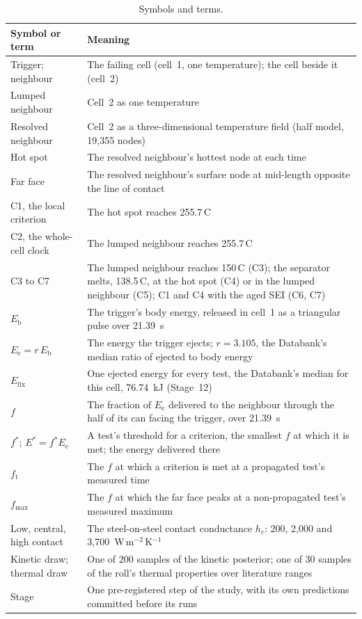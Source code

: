 \documentclass[preprint,12pt]{elsarticle}
\newcommand{\degC}{\,\textdegree C}
\newcommand{\fs}{f^{*}}
\newcommand{\ft}{f_{\mathrm{t}}}
\newcommand{\fmax}{f_{\mathrm{max}}}
\newcommand{\Eb}{E_{\mathrm{b}}}
\newcommand{\Ee}{E_{\mathrm{e}}}
\begin{document}
\begin{table}[!tbp]
\centering
\footnotesize
\caption{Symbols and terms.}
\label{tab:terms}
\begin{tabular}{@{}p{}p{}@{}}
\toprule
Symbol or term & Meaning \\
\midrule
Trigger; neighbour & The failing cell (cell~1, one temperature); the cell beside it (cell~2) \\
Lumped neighbour & Cell~2 as one temperature \\
Resolved neighbour & Cell~2 as a three-dimensional temperature field (half model, 19,355 nodes) \\
Hot spot & The resolved neighbour's hottest node at each time \\
Far face & The resolved neighbour's surface node at mid-length opposite the line of contact \\
C1, the local criterion & The hot spot reaches 255.7\degC{} \\
C2, the whole-cell clock & The lumped neighbour reaches 255.7\degC{} \\
C3 to C7 & The lumped neighbour reaches 150\degC{} (C3); the separator melts, 138.5\degC, at the hot spot (C4) or in the lumped neighbour (C5); C1 and C4 with the aged SEI (C6, C7) \\
$\Eb$ & The trigger's body energy, released in cell~1 as a triangular pulse over 21.39~s \\
$\Ee=r\,\Eb$ & The energy the trigger ejects; $r=3.105$, the Databank's median ratio of ejected to body energy \\
$E_{\mathrm{fix}}$ & One ejected energy for every test, the Databank's median for this cell, 76.74~kJ (Stage~12) \\
$f$ & The fraction of $\Ee$ delivered to the neighbour through the half of its can facing the trigger, over 21.39~s \\
$\fs$; $E^{*}=\fs\Ee$ & A test's threshold for a criterion, the smallest $f$ at which it is met; the energy delivered there \\
$\ft$ & The $f$ at which a criterion is met at a propagated test's measured time \\
$\fmax$ & The $f$ at which the far face peaks at a non-propagated test's measured maximum \\
Low, central, high contact & The steel-on-steel contact conductance $h_c$: 200, 2,000 and 3,700~W\,m$^{-2}$\,K$^{-1}$ \\
Kinetic draw; thermal draw & One of 200 samples of the kinetic posterior; one of 30 samples of the roll's thermal properties over literature ranges \\
Stage & One pre-registered step of the study, with its own predictions committed before its runs \\
\bottomrule
\end{tabular}
\end{table}
\end{document}

